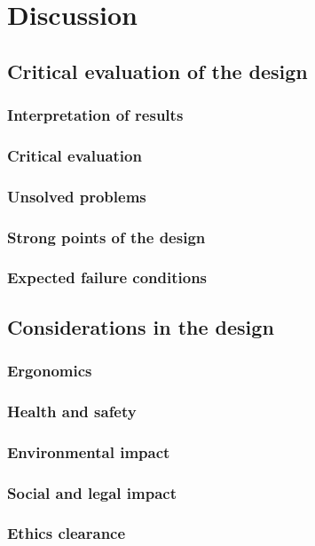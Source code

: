 
\section{Discussion}

\subsection{Critical evaluation of the design}

\subsubsection{Interpretation of results}

\subsubsection{Critical evaluation}

\subsubsection{Unsolved problems}

\subsubsection{Strong points of the design}

\subsubsection{Expected failure conditions}

\subsection{Considerations in the design}

\subsubsection{Ergonomics}

\subsubsection{Health and safety}

\subsubsection{Environmental impact}

\subsubsection{Social and legal impact}

\subsubsection{Ethics clearance}

\newpage



